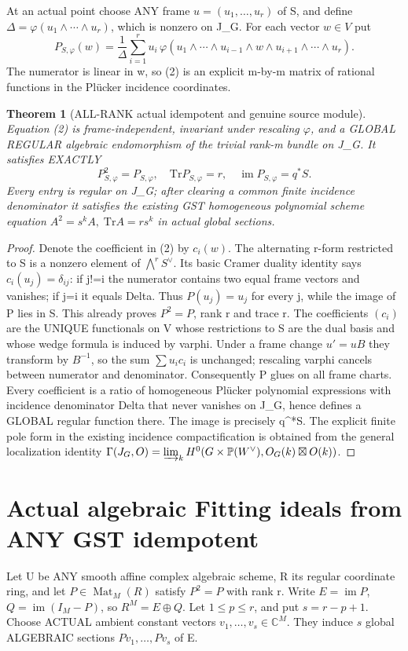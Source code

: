 \documentclass[11pt]{article}
\newtheorem{theorem}{Theorem}[section]
\begin{document}
At an actual point choose ANY frame
$u=(u_1,\ldots,u_r)$ of S, and define
$\Delta=\varphi(u_1\wedge\cdots\wedge u_r)$,
which is nonzero on J_G.
For each vector $w\in V$ put
\[
 \boxed{
 P_{S,\varphi}(w)=
 \frac1\Delta
 \sum_{i=1}^r u_i\,
 \varphi(u_1\wedge\cdots\wedge
             u_{i-1}\wedge w\wedge
             u_{i+1}\wedge\cdots\wedge u_r).
 }                                                     \tag{2}
\]
The numerator is linear in w,
so (2) is an explicit m-by-m
matrix of rational functions in
the Pl\"ucker incidence coordinates.

\begin{theorem}[ALL-RANK actual idempotent and genuine source module]
Equation (2) is frame-independent,
invariant under rescaling
$\varphi$, and a GLOBAL REGULAR
algebraic endomorphism of the
trivial rank-m bundle on J_G.
It satisfies EXACTLY
\[
 \boxed{P_{S,\varphi}^2=P_{S,\varphi},
 \quad\mathrm{Tr}P_{S,\varphi}=r,
 \quad\operatorname{im}P_{S,\varphi}=q^*S.}    \tag{3}
\]
Every entry is regular on J_G;
after clearing a common finite
incidence denominator it satisfies
the existing GST homogeneous
polynomial scheme equation
$A^2=s^k A,\;\mathrm{Tr}A=r s^k$
in actual global sections.
\end{theorem}
\begin{proof}
Denote the coefficient in (2)
by $c_i(w)$. The alternating
r-form restricted to S is a
nonzero element of
$\bigwedge^r S^\vee$.
Its basic Cramer duality
identity says
$c_i(u_j)=\delta_{ij}$:
if j!=i the numerator
contains two equal frame
vectors and vanishes;
if j=i it equals Delta.
Thus $P(u_j)=u_j$
for every j, while the
image of P lies in S.
This already proves $P^2=P$,
rank r and trace r.
The coefficients $(c_i)$
are the UNIQUE functionals
on V whose restrictions
to S are the dual basis
and whose wedge formula
is induced by varphi.
Under a frame change
$u'=uB$ they transform
by $B^{-1}$, so the sum
$\sum u_i c_i$ is unchanged;
rescaling varphi cancels
between numerator and
denominator. Consequently P
glues on all frame charts.
Every coefficient is a ratio
of homogeneous Pl\"ucker
polynomial expressions with
incidence denominator Delta
that never vanishes on J_G,
hence defines a GLOBAL
regular function there.
The image is precisely
q^*S. The explicit
finite pole form in the
existing incidence
compactification is obtained
from the general localization
identity
$\Gamma(J_G,O)=
\varinjlim_k H^0(G\times\mathbb P(W^\vee),
                  O_G(k)\boxtimes O(k))$.
\end{proof}

\section{Actual algebraic Fitting ideals from ANY GST idempotent}
Let U be ANY smooth affine
complex algebraic scheme,
R its regular coordinate ring,
and let $P\in\operatorname{Mat}_M(R)$
satisfy $P^2=P$ with rank r.
Write $E=\operatorname{im}P$,
$Q=\operatorname{im}(I_M-P)$,
so $R^M=E\oplus Q$.
Let $1\le p\le r$, and
put $s=r-p+1$. Choose
ACTUAL ambient constant
vectors $v_1,\ldots,v_s\in\mathbb C^M$.
They induce $s$ global
ALGEBRAIC sections
$Pv_1,\ldots,Pv_s$ of E.
\end{document}
